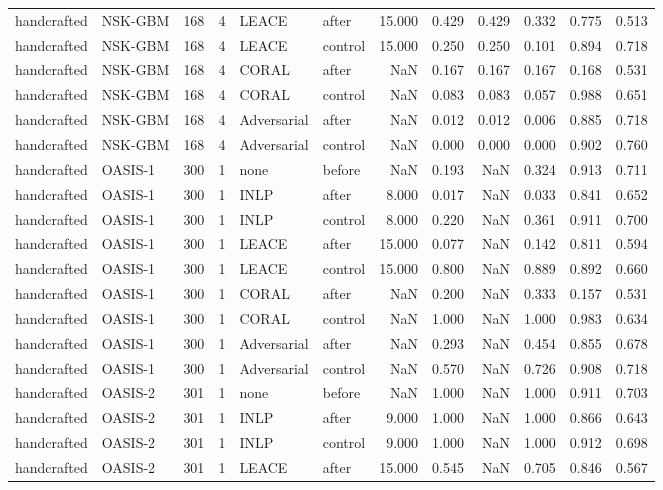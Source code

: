 \begin{tabular}{llrrllrrrrrr}
handcrafted & NSK-GBM & 168 & 4 & LEACE & after & 15.000 & 0.429 & 0.429 & 0.332 & 0.775 & 0.513 \\
handcrafted & NSK-GBM & 168 & 4 & LEACE & control & 15.000 & 0.250 & 0.250 & 0.101 & 0.894 & 0.718 \\
handcrafted & NSK-GBM & 168 & 4 & CORAL & after & NaN & 0.167 & 0.167 & 0.167 & 0.168 & 0.531 \\
handcrafted & NSK-GBM & 168 & 4 & CORAL & control & NaN & 0.083 & 0.083 & 0.057 & 0.988 & 0.651 \\
handcrafted & NSK-GBM & 168 & 4 & Adversarial & after & NaN & 0.012 & 0.012 & 0.006 & 0.885 & 0.718 \\
handcrafted & NSK-GBM & 168 & 4 & Adversarial & control & NaN & 0.000 & 0.000 & 0.000 & 0.902 & 0.760 \\
handcrafted & OASIS-1 & 300 & 1 & none & before & NaN & 0.193 & NaN & 0.324 & 0.913 & 0.711 \\
handcrafted & OASIS-1 & 300 & 1 & INLP & after & 8.000 & 0.017 & NaN & 0.033 & 0.841 & 0.652 \\
handcrafted & OASIS-1 & 300 & 1 & INLP & control & 8.000 & 0.220 & NaN & 0.361 & 0.911 & 0.700 \\
handcrafted & OASIS-1 & 300 & 1 & LEACE & after & 15.000 & 0.077 & NaN & 0.142 & 0.811 & 0.594 \\
handcrafted & OASIS-1 & 300 & 1 & LEACE & control & 15.000 & 0.800 & NaN & 0.889 & 0.892 & 0.660 \\
handcrafted & OASIS-1 & 300 & 1 & CORAL & after & NaN & 0.200 & NaN & 0.333 & 0.157 & 0.531 \\
handcrafted & OASIS-1 & 300 & 1 & CORAL & control & NaN & 1.000 & NaN & 1.000 & 0.983 & 0.634 \\
handcrafted & OASIS-1 & 300 & 1 & Adversarial & after & NaN & 0.293 & NaN & 0.454 & 0.855 & 0.678 \\
handcrafted & OASIS-1 & 300 & 1 & Adversarial & control & NaN & 0.570 & NaN & 0.726 & 0.908 & 0.718 \\
handcrafted & OASIS-2 & 301 & 1 & none & before & NaN & 1.000 & NaN & 1.000 & 0.911 & 0.703 \\
handcrafted & OASIS-2 & 301 & 1 & INLP & after & 9.000 & 1.000 & NaN & 1.000 & 0.866 & 0.643 \\
handcrafted & OASIS-2 & 301 & 1 & INLP & control & 9.000 & 1.000 & NaN & 1.000 & 0.912 & 0.698 \\
handcrafted & OASIS-2 & 301 & 1 & LEACE & after & 15.000 & 0.545 & NaN & 0.705 & 0.846 & 0.567 \\

\end{tabular}

